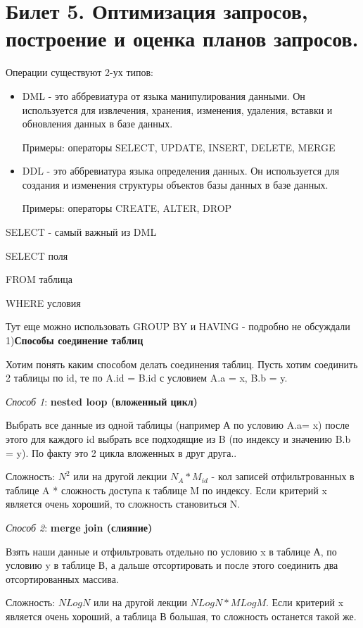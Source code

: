 \newpage
\section {Билет 5. Оптимизация запросов, построение и оценка планов запросов.}

Операции существуют 2-ух типов: 
\begin{itemize}
	\item DML - это аббревиатура от языка манипулирования данными. Он используется для извлечения, хранения, изменения, удаления, вставки и обновления данных в базе данных.
	
	Примеры: операторы SELECT, UPDATE, INSERT, DELETE, MERGE
	
	\item DDL - это аббревиатура языка определения данных. Он используется для создания и изменения структуры объектов базы данных в базе данных.
	
	Примеры: операторы CREATE, ALTER, DROP
\end{itemize}


SELECT - самый важный из DML

SELECT поля

FROM таблица 

WHERE условия 

Тут еще можно использовать GROUP BY и HAVING - подробно не обсуждали 
\\[10pt]
1)\textbf{Способы соединение таблиц }

Хотим понять каким способом делать соединения таблиц. Пусть хотим соединить 2 таблицы по id, те по A.id = B.id с условием A.a = x, B.b = y.

\textit{Способ 1}: \textbf{nested loop (вложенный цикл)}

Выбрать все данные из одной таблицы (например А по условию A.a= x) после этого для каждого id выбрать все подходящие из B (по индексу и значению B.b = y). По факту это 2 цикла вложенных в друг друга..

Сложность: $N^2$ или на другой лекции $N_A * M_{id}$  -  кол записей отфильтрованных в таблице A * сложность доступа к таблице M по индексу. Если критерий x является очень хороший, то сложность становиться N. 

\textit{Способ 2}: \textbf{merge join (слияние)}

Взять наши данные и отфильтровать отдельно по условию x в таблице А, по условию y в таблице В, а дальше отсортировать и после этого соединить два отсортированных массива.

Сложность: $NLogN$  или на другой лекции $NLogN * MLogM$. Если критерий x является очень хороший, а таблица В большая, то сложность останется такой же. 

